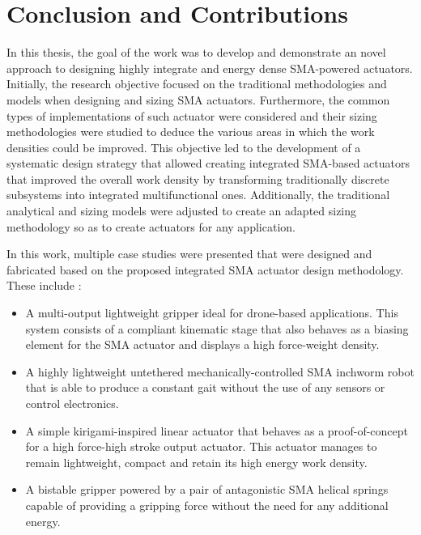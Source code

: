 
\chapter*{Conclusion and Contributions}

In this thesis, the goal of the work was to develop and demonstrate an novel approach to designing highly integrate and energy dense SMA-powered actuators. Initially, the research objective focused on the traditional methodologies and models when designing and sizing SMA actuators. Furthermore, the common types of implementations of such actuator were considered and their sizing methodologies were studied to deduce the various areas in which the work densities could be improved. This objective led to the development of a systematic design strategy that allowed creating integrated SMA-based actuators that improved the overall work density by transforming traditionally discrete subsystems into integrated multifunctional ones. Additionally, the traditional analytical and sizing models were adjusted to create an adapted sizing methodology so as to create actuators for any application.

In this work, multiple case studies were presented that were designed and fabricated based on the proposed integrated SMA actuator design methodology. These include :

\begin{itemize}
    \item A multi-output lightweight gripper ideal for drone-based applications. This system consists of a compliant kinematic stage that also behaves as a biasing element for the SMA actuator and displays a high force-weight density.
    \item A highly lightweight untethered mechanically-controlled SMA inchworm robot that is able to produce a constant gait without the use of any sensors or control electronics.
    \item A simple kirigami-inspired linear actuator that behaves as a proof-of-concept for a high force-high stroke output actuator. This actuator manages to remain lightweight, compact and retain its high energy work density.
    \item A bistable gripper powered by a pair of antagonistic SMA helical springs capable of providing a gripping force without the need for any additional energy.
\end{itemize}

